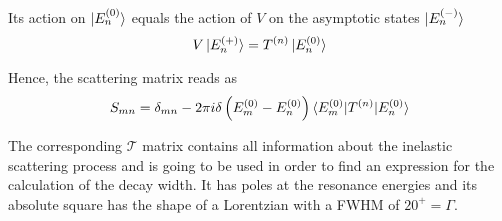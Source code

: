 Its action on $\ket{E_n^{(0)}}$ equals the action of $V$ on the asymptotic
states $\ket{E_n^{(-)}}$
\begin{equation}
 V \ket{E_n^{(+)}} = T^{(n)} \ket{E_n^{(0)}}
\end{equation}

Hence, the scattering matrix reads as
\begin{equation}
 S_{mn} = \delta_{mn} - 2\pi i \delta \left(E_m^{(0)} - E_n^{(0)} \right)
          \braket{E_m^{(0)}| T^{(n)} |E_n^{(0)}}
\end{equation}

The corresponding $\mathcal{T}$ matrix contains all information about the
inelastic scattering process and is going to be used in order
to find an expression for the calculation of the decay width.
It has poles at the resonance energies and its absolute square has the
shape of a Lorentzian with a \ac{FWHM} of $20^+ = \Gamma$.


